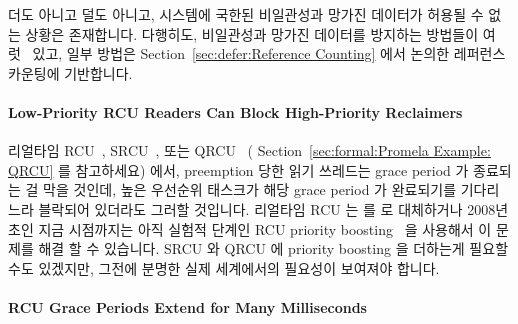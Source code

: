 더도 아니고 덜도 아니고, 시스템에 국한된 비일관성과 망가진 데이터가 허용될 수
없는 상황은 존재합니다.
다행히도, 비일관성과 망가진 데이터를 방지하는 방법들이
여럿~\cite{PaulEdwardMcKenneyPhD,Arcangeli03} 있고, 일부 방법은
Section~\ref{sec:defer:Reference Counting} 에서 논의한 레퍼런스 카운팅에
기반합니다.

\paragraph{Low-Priority RCU Readers Can Block High-Priority Reclaimers}

리얼타임 RCU~\cite{DinakarGuniguntala2008IBMSysJ},
SRCU~\cite{PaulEMcKenney2006c}, 또는
QRCU~\cite{PaulEMcKenney2007QRCUspin} (
Section~\ref{sec:formal:Promela Example: QRCU} 를 참고하세요) 에서,
preemption 당한 읽기 쓰레드는 grace period 가 종료되는 걸 막을 것인데, 높은
우선순위 태스크가 해당 grace period 가 완료되기를 기다리느라 블락되어 있더라도
그러할 것입니다.
리얼타임 RCU 는  를  로 대체하거나 2008년
초인 지금 시점까지는 아직 실험적 단계인 RCU priority
boosting~\cite{PaulEMcKenney2007BoostRCU,DinakarGuniguntala2008IBMSysJ} 을
사용해서 이 문제를 해결 할 수 있습니다.
SRCU 와 QRCU 에 priority boosting 을 더하는게 필요할 수도 있겠지만, 그전에
분명한 실제 세계에서의 필요성이 보여져야 합니다.

\paragraph{RCU Grace Periods Extend for Many Milliseconds}

